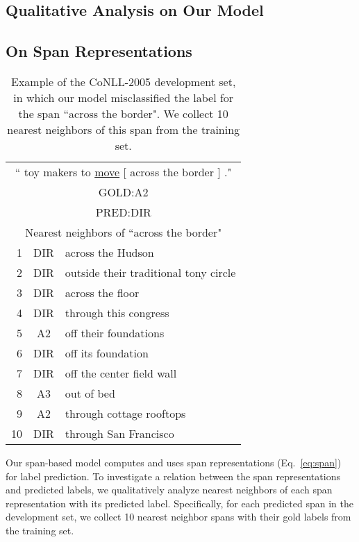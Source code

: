 \documentclass[11pt,a4paper]{article}
\begin{document}
\subsection{Qualitative Analysis on Our Model}
\label{sec:qa}

\subsection*{On Span Representations}
\begin{table}[t]
  \centering
  {\small
  \begin{tabular}{rcl} \toprule
  \multicolumn{3}{c}{`` toy makers to \underline{move} [ across the border ] ."} \\
  \multicolumn{3}{c}{\hspace{2.9cm}GOLD:A2} \\
  \multicolumn{3}{c}{\hspace{2.9cm}PRED:DIR} \\ \hline \hline
  \multicolumn{3}{c}{Nearest neighbors of ``across the border"}\\ \hline
1 & DIR & across the Hudson \\
2 & DIR & outside their traditional tony circle \\
3 & DIR & across the floor \\
4 & DIR & through this congress \\
5 & A2 & off their foundations \\
6 & DIR & off its foundation\\
7 & DIR & off the center field wall \\
8 & A3 & out of bed \\
9 & A2 & through cottage rooftops \\
10 & DIR & through San Francisco \\ \toprule
  \end{tabular}
  }
  \caption{\label{tab:knn} Example of the CoNLL-2005 development set, in which our model misclassified the label for the span ``across the border". We collect 10 nearest neighbors of this span from the training set.}
\end{table}

\noindent
Our span-based model computes and uses span representations (Eq.~\ref{eq:span}) for label prediction.
To investigate a relation between the span representations and predicted labels, we qualitatively analyze nearest neighbors of each span representation with its predicted label.
Specifically, for each predicted span in the development set, we collect 10 nearest neighbor spans with their gold labels from the training set.
\end{document}
